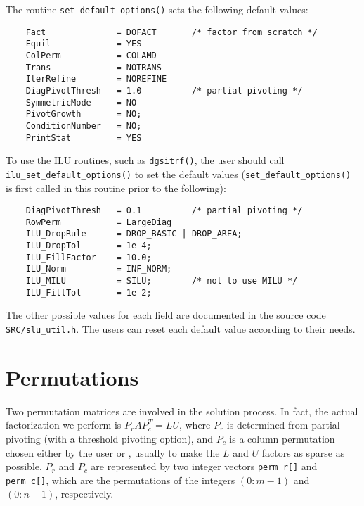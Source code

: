 The routine {\tt set\_default\_options()} sets the following default
values:
\begin{verbatim}
    Fact              = DOFACT       /* factor from scratch */
    Equil             = YES             
    ColPerm           = COLAMD
    Trans             = NOTRANS
    IterRefine        = NOREFINE
    DiagPivotThresh   = 1.0          /* partial pivoting */
    SymmetricMode     = NO
    PivotGrowth       = NO;
    ConditionNumber   = NO;
    PrintStat         = YES
\end{verbatim}

To use the ILU routines, such as {\tt dgsitrf()}, the user should call
{\tt  ilu\_set\_default\_options()} to set the default values
({\tt set\_default\_options()} is first called in this routine prior
to the following):
\begin{verbatim}
    DiagPivotThresh   = 0.1          /* partial pivoting */
    RowPerm           = LargeDiag
    ILU_DropRule      = DROP_BASIC | DROP_AREA;
    ILU_DropTol       = 1e-4;
    ILU_FillFactor    = 10.0;
    ILU_Norm          = INF_NORM;
    ILU_MILU          = SILU;        /* not to use MILU */   
    ILU_FillTol       = 1e-2;
\end{verbatim}

The other possible values for each field are documented in the
source code {\tt SRC/slu\_util.h}.
The users can reset each default value according to their needs.


\section{Permutations}
\label{sec:perm}
Two permutation matrices are involved in the solution process. In fact, 
the actual factorization
we perform is $P_rAP_c^T=LU$, where $P_r$ is determined from partial pivoting 
(with a threshold pivoting option), and $P_c$ is a column permutation
chosen either by the user or {\superlu}, usually to make the $L$
and $U$ factors as sparse as possible.
$P_r$ and $P_c$ are represented by two integer vectors
{\tt perm\_r[]} and {\tt perm\_c[]}, which are the permutations
of the integers $(0:m-1)$ and $(0:n-1)$, respectively.


